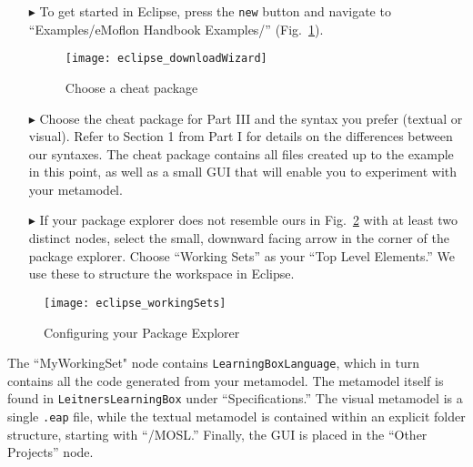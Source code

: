 \begin{itemize}

\item[$\blacktriangleright$] To get started in Eclipse, press the \texttt{new} button and navigate to ``Examples/eMoflon Handbook Examples/''
(Fig.~\ref{eclipse:downloadWizard}).

\begin{figure}[htbp]
	\centering
  \texttt{[image: eclipse\_downloadWizard]}
	\caption{Choose a cheat package}
	\label{eclipse:downloadWizard}
\end{figure}

\item[$\blacktriangleright$] Choose the cheat package for Part III and the syntax you prefer (textual or visual). Refer to Section 1 from Part I for details on
the differences between our syntaxes. The cheat package contains all files created up to the example in this point, as well as a small GUI that will enable
you to experiment with your metamodel.

\newpage

\vspace*{0.5cm}

\item[$\blacktriangleright$] If your package explorer does not resemble ours in Fig.~\ref{eclipse:workingSets} with at least two distinct nodes, select the
small, downward facing arrow in the corner of the package explorer. Choose ``Working Sets'' as your ``Top Level Elements.'' We use these to structure the
workspace in Eclipse.

\vspace{0.75cm}

\end{itemize}

\begin{figure}[htbp]
	\centering
  \texttt{[image: eclipse\_workingSets]}
	\caption{Configuring your Package Explorer}
	\label{eclipse:workingSets}
\end{figure}

The ``MyWorkingSet" node contains \texttt{Learn\-ing\-Box\-Lang\-uage}, which in turn contains all the code generated from your metamodel. The metamodel itself
is found in \texttt{Leit\-ners\-Learn\-ing\-Box} under ``Specifications.'' The visual metamodel is a single \texttt{.eap} file, while the textual metamodel is
contained within an explicit folder structure, starting with ``/MOSL.'' Finally, the GUI is placed in the ``Other Projects'' node.


